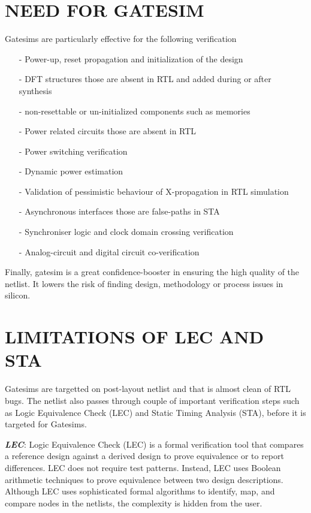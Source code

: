 \section {NEED FOR GATESIM}
Gatesims are particularly effective for the following verification
\begin{itemize}
	\item[-]Power-up, reset propagation and initialization of the design
	\item[-]DFT structures those are absent in RTL and added during or after synthesis
	\item[-]non-resettable or un-initialized components such as memories
	\item[-]Power related circuits those are absent in RTL
	\item[-]Power switching verification
	\item[-]Dynamic power estimation
	\item[-]Validation of pessimistic behaviour of X-propagation in RTL simulation
	\item[-]Asynchronous interfaces those are false-paths in STA
	\item[-]Synchroniser logic and clock domain crossing verification
	\item[-]Analog-circuit and digital circuit co-verification
\end{itemize}

Finally, gatesim is a great confidence-booster in ensuring the high quality of the netlist. It lowers the risk of finding design, methodology or process issues in silicon.




\section{LIMITATIONS OF LEC AND STA}

Gatesims are targetted on post-layout netlist and that is almost clean of RTL bugs. The netlist also passes through couple of important verification steps such as Logic Equivalence Check (LEC) and Static Timing Analysis (STA), before it is targeted for Gatesims.

\emph {\bf LEC}: Logic Equivalence Check (LEC) is a formal verification tool that compares a reference design against a derived design to prove equivalence or to report differences.  LEC does not require test patterns. Instead, LEC uses Boolean arithmetic techniques to prove equivalence between two design descriptions\cite{ieee:boolean}. Although LEC uses sophisticated formal algorithms to identify, map, and compare nodes in the netlists, the complexity is hidden from the user\cite{lec}.

